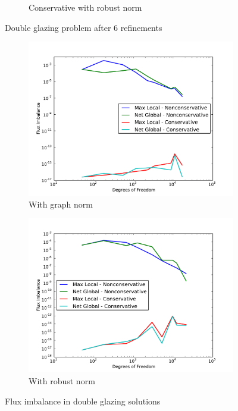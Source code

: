 \documentclass[letterpaper]{article}
\begin{document}
\begin{figure}
\begin{subfigure}[t]{0.45\textwidth}
\caption{Conservative with robust norm}
\label{fig:doubleglazingRobust6c}
\end{subfigure}
\caption{Double glazing problem after 6 refinements}
\end{figure}

\begin{figure}
\centering
\begin{subfigure}[t]{0.45\textwidth}
\centering
\includegraphics[width=\textwidth]{figs/DoubleGlazing/graphFlux.pdf}
\caption{With graph norm}
\label{fig:doubleglazingGraphFlux}
\end{subfigure}
\begin{subfigure}[t]{0.45\textwidth}
\centering
\includegraphics[width=\textwidth]{figs/DoubleGlazing/robustFlux.pdf}
\caption{With robust norm}
\label{fig:doubleglazingRobustFlux}
\end{subfigure}
\caption{Flux imbalance in double glazing solutions}
\end{figure}



\end{document}
